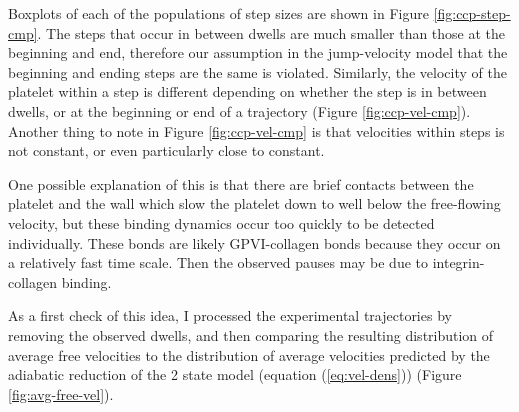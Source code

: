 \documentclass{article}
\begin{document}
Boxplots of each of the populations of step sizes are shown in
Figure \ref{fig:ccp-step-cmp}. The steps that occur in between dwells
are much smaller than those at the beginning and end, therefore our
assumption in the jump-velocity model that the beginning and ending
steps are the same is violated. Similarly, the velocity of the
platelet within a step is different depending on whether the step is
in between dwells, or at the beginning or end of a trajectory (Figure
\ref{fig:ccp-vel-cmp}). Another thing to note in Figure
\ref{fig:ccp-vel-cmp} is that velocities within steps is not constant,
or even particularly close to constant.

One possible explanation of this is that there are brief contacts
between the platelet and the wall which slow the platelet down to well
below the free-flowing velocity, but these binding dynamics occur too
quickly to be detected individually. These bonds are likely
GPVI-collagen bonds because they occur on a relatively fast time
scale. Then the observed pauses may be due to integrin-collagen
binding.

As a first check of this idea, I processed the experimental
trajectories by removing the observed dwells, and then comparing the
resulting distribution of average free velocities to the distribution
of average velocities predicted by the adiabatic reduction of the 2
state model (equation (\ref{eq:vel-dens})) (Figure \ref{fig:avg-free-vel}).


\end{document}
